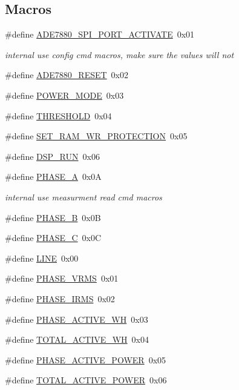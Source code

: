 \subsection*{Macros}
\begin{DoxyCompactItemize}
\item 
\#define \hyperlink{a00043_a430d76623597b550145ee76e95e84c48}{A\-D\-E7880\-\_\-\-S\-P\-I\-\_\-\-P\-O\-R\-T\-\_\-\-A\-C\-T\-I\-V\-A\-T\-E}~0x01
\begin{DoxyCompactList}\small\item\em internal use config cmd macros, make sure the values will not \end{DoxyCompactList}\item 
\#define \hyperlink{a00043_af6e27751df5653af1abdb5c1c505b7e1}{A\-D\-E7880\-\_\-\-R\-E\-S\-E\-T}~0x02
\item 
\#define \hyperlink{a00043_a4e7bf0c205872c6db180b06792a62118}{P\-O\-W\-E\-R\-\_\-\-M\-O\-D\-E}~0x03
\item 
\#define \hyperlink{a00043_a4679d8ea8690999a6c6c7c0cb245c879}{T\-H\-R\-E\-S\-H\-O\-L\-D}~0x04
\item 
\#define \hyperlink{a00043_a5b534b9caab512045a6e762f3930a501}{S\-E\-T\-\_\-\-R\-A\-M\-\_\-\-W\-R\-\_\-\-P\-R\-O\-T\-E\-C\-T\-I\-O\-N}~0x05
\item 
\#define \hyperlink{a00043_a1805e103988f08b8fac817624918cf47}{D\-S\-P\-\_\-\-R\-U\-N}~0x06
\item 
\#define \hyperlink{a00043_ad214039f52b011ce2bd6c85ff98a981b}{P\-H\-A\-S\-E\-\_\-\-A}~0x0\-A
\begin{DoxyCompactList}\small\item\em internal use measurment read cmd macros \end{DoxyCompactList}\item 
\#define \hyperlink{a00043_ad7b96feed1e1c12515dad5e926b2c62e}{P\-H\-A\-S\-E\-\_\-\-B}~0x0\-B
\item 
\#define \hyperlink{a00043_a3ceb83fb10c2af19b468d508448f24e2}{P\-H\-A\-S\-E\-\_\-\-C}~0x0\-C
\item 
\#define \hyperlink{a00043_af94cfb03461685fead1fe045d5c96f01}{L\-I\-N\-E}~0x00
\item 
\#define \hyperlink{a00043_af0c09c5a455410e6fbd35fd55221338f}{P\-H\-A\-S\-E\-\_\-\-V\-R\-M\-S}~0x01
\item 
\#define \hyperlink{a00043_a15c9ccf287820001431c33c4bb25a23b}{P\-H\-A\-S\-E\-\_\-\-I\-R\-M\-S}~0x02
\item 
\#define \hyperlink{a00043_a4ee773ad07fa969b9990f9bb3a1a2093}{P\-H\-A\-S\-E\-\_\-\-A\-C\-T\-I\-V\-E\-\_\-\-W\-H}~0x03
\item 
\#define \hyperlink{a00043_ad8d2fc353ef124a8144e6d8264e43d1a}{T\-O\-T\-A\-L\-\_\-\-A\-C\-T\-I\-V\-E\-\_\-\-W\-H}~0x04
\item 
\#define \hyperlink{a00043_abd3f95c7cd63d0627552d293bf49e026}{P\-H\-A\-S\-E\-\_\-\-A\-C\-T\-I\-V\-E\-\_\-\-P\-O\-W\-E\-R}~0x05
\item 
\#define \hyperlink{a00043_a7d0d4057be5aaf168a22ee4379e6ff30}{T\-O\-T\-A\-L\-\_\-\-A\-C\-T\-I\-V\-E\-\_\-\-P\-O\-W\-E\-R}~0x06
\end{DoxyCompactItemize}
